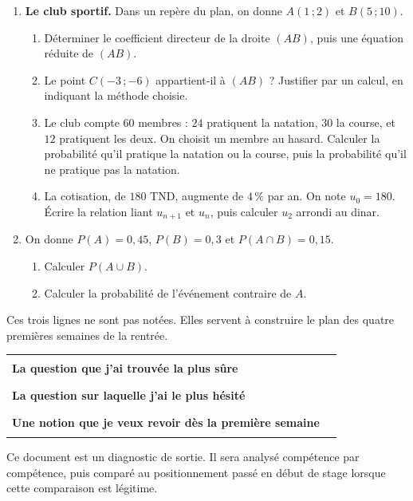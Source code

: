 \documentclass[10pt,a4paper]{article}
\begin{document}
\needspace{68mm}\par\vspace{3mm}
\begin{enumerate}
\needspace{22mm}
\item[\textbf{C1.}] \textbf{Le club sportif.} Dans un repère du plan, on donne $A(1\,;2)$ et $B(5\,;10)$.
\begin{enumerate}
\item Déterminer le coefficient directeur de la droite $(AB)$, puis une équation réduite de $(AB)$.
\item Le point $C(-3\,;-6)$ appartient-il à $(AB)$ ? Justifier par un calcul, en indiquant la méthode choisie.
\item Le club compte $60$ membres : $24$ pratiquent la natation, $30$ la course, et $12$ pratiquent les deux.
On choisit un membre au hasard. Calculer la probabilité qu'il pratique la natation ou la course,
puis la probabilité qu'il ne pratique pas la natation.
\item La cotisation, de $180$ TND, augmente de $4\,\%$ par an. On note $u_0 = 180$. Écrire la relation liant
$u_{n+1}$ et $u_n$, puis calculer $u_2$ arrondi au dinar.
\end{enumerate}
\par\vspace{1.2mm}
\needspace{22mm}
\item[\textbf{C2.}] On donne $P(A) = 0{,}45$, $P(B) = 0{,}3$ et $P(A\cap B) = 0{,}15$.
\begin{enumerate}
\item Calculer $P(A\cup B)$.
\item Calculer la probabilité de l'événement contraire de $A$.
\end{enumerate}
\par\vspace{1.2mm}
\end{enumerate}
\brouillon{\dimexpr\textheight/3\relax}
\newpage
{}
\begin{methodbox}Ces trois lignes ne sont pas notées. Elles servent à construire le plan des quatre premières semaines de la rentrée.\end{methodbox}
\par\noindent\begin{tabularx}{\linewidth}{>{\bfseries}p{62mm} X}
\toprule
La question que j'ai trouvée la plus sûre & \rule{85mm}{0.32pt} \\
La question sur laquelle j'ai le plus hésité & \rule{85mm}{0.32pt} \\
Une notion que je veux revoir dès la première semaine & \rule{85mm}{0.32pt} \\
\bottomrule\end{tabularx}
\vfill
\begin{graybox}\small Ce document est un diagnostic de sortie. Il sera analysé compétence par compétence, puis comparé au positionnement passé en début de stage lorsque cette comparaison est légitime.\end{graybox}
\end{document}
